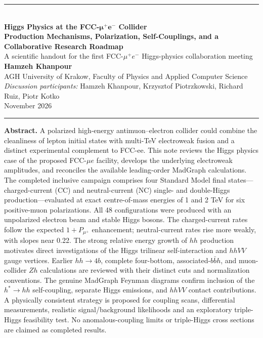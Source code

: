 \documentclass[12pt,a4paper]{article}
\begin{document}

\begin{center}
{\color{aghgreen}\rule{\linewidth}{2pt}}\\[6pt]
{\LARGE\bfseries Higgs Physics at the FCC-$\boldsymbol{\mu^+e^-}$ Collider}\\[6pt]
{\large\bfseries Production Mechanisms, Polarization, Self-Couplings, and a Collaborative Research Roadmap}\\[8pt]
{\normalsize A scientific handout for the first FCC-$\mu^+e^-$ Higgs-physics collaboration meeting}\\[5pt]
{\bfseries Hamzeh Khanpour}\\
AGH University of Krakow, Faculty of Physics and Applied Computer Science\\
\emph{Discussion participants:} Hamzeh Khanpour, Krzysztof Piotrzkowski, Richard Ruiz, Piotr Kotko\\
November 2026\\[5pt]
{\color{aghred}\rule{0.4\linewidth}{1pt}}
\end{center}


\textbf{Abstract.}\; A polarized high-energy antimuon--electron collider could combine the cleanliness of lepton initial states with multi-TeV electroweak fusion and a distinct experimental complement to FCC-ee. This note reviews the Higgs physics case of the proposed FCC-$\mu e$ facility, develops the underlying electroweak amplitudes, and reconciles the available leading-order MadGraph calculations. The completed inclusive campaign comprises four Standard Model final states---charged-current (CC) and neutral-current (NC) single- and double-Higgs production---evaluated at exact centre-of-mass energies of 1 and 2 TeV for six positive-muon polarizations. All 48 configurations were produced with an unpolarized electron beam and stable Higgs bosons. The charged-current rates follow the expected $1+P_{\mu^+}$ enhancement; neutral-current rates rise more weakly, with slopes near 0.22. The strong relative energy growth of $hh$ production motivates direct investigations of the Higgs trilinear self-interaction and $hhVV$ gauge vertices. Earlier $hh\to4b$, complete four-bottom, associated-$b\bar b h$, and muon-collider $Zh$ calculations are reviewed with their distinct cuts and normalization conventions. The genuine MadGraph Feynman diagrams confirm inclusion of the $h^*\to hh$ self-coupling, separate Higgs emissions, and $hhVV$ contact contributions. A physically consistent strategy is proposed for coupling scans, differential measurements, realistic signal/background likelihoods and an exploratory triple-Higgs feasibility test. No anomalous-coupling limits or triple-Higgs cross sections are claimed as completed results.
\end{document}
